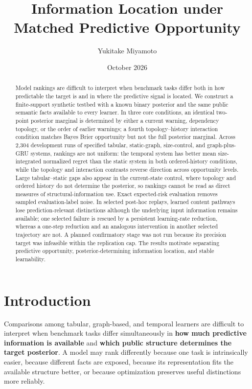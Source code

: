 \documentclass[11pt]{article}
\title{Information Location under Matched Predictive Opportunity}
\author{Yukitake Miyamoto}
\affil{Independent Researcher, Japan}
\date{October 2026}
\begin{document}
\maketitle

\begin{abstract}
Model rankings are difficult to interpret when benchmark tasks differ both in how predictable the target is and in where the predictive signal is located. We construct a finite-support synthetic testbed with a known binary posterior and the same public semantic facts available to every learner. In three core conditions, an identical two-point posterior marginal is determined by either a current warning, dependency topology, or the order of earlier warnings; a fourth topology--history interaction condition matches Bayes Brier opportunity but not the full posterior marginal. Across 2,304 development runs of specified tabular, static-graph, size-control, and graph-plus-GRU systems, rankings are not uniform: the temporal system has better mean size-integrated normalized regret than the static system in both ordered-history conditions, while the topology and interaction contrasts reverse direction across opportunity levels. Large tabular--static gaps also appear in the current-state control, where topology and ordered history do not determine the posterior, so rankings cannot be read as direct measures of structural-information use. Exact expected-risk evaluation removes sampled evaluation-label noise. In selected post-hoc replays, learned content pathways lose prediction-relevant distinctions although the underlying input information remains available; one selected failure is rescued by a persistent learning-rate reduction, whereas a one-step reduction and an analogous intervention in another selected trajectory are not. A planned confirmatory stage was not run because its precision target was infeasible within the replication cap. The results motivate separating predictive opportunity, posterior-determining information location, and stable learnability.
\end{abstract}

\section{Introduction}

Comparisons among tabular, graph-based, and temporal learners are difficult to interpret when benchmark tasks differ simultaneously in \textbf{how much predictive information is available} and \textbf{which public structure determines the target posterior}. A model may rank differently because one task is intrinsically easier, because different facts are exposed, because its representation fits the available structure better, or because optimization preserves useful distinctions more reliably.
\end{document}
